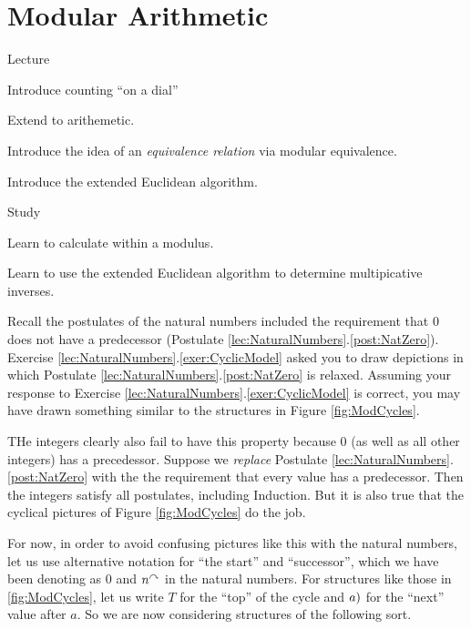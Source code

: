 \chapter{Modular Arithmetic}

\begin{goals}
	\begin{goal}{Lecture}
		\item Introduce counting ``on a dial''
		\item Extend to arithemetic.
		\item Introduce the idea of an \emph{equivalence relation} via modular equivalence.
		\item Introduce the extended Euclidean algorithm.
	\end{goal}
	
	\begin{goal}{Study}
		\item Learn to calculate within a modulus.
		\item Learn to use the extended Euclidean algorithm to determine multipicative inverses.
	\end{goal}
\end{goals}

Recall the postulates of the natural numbers included the requirement that $0$ does not have  a predecessor (Postulate \ref{lec:NaturalNumbers}.\ref{post:NatZero}).  Exercise \ref{lec:NaturalNumbers}.\ref{exer:CyclicModel} asked you to draw depictions in which Postulate \ref{lec:NaturalNumbers}.\ref{post:NatZero} is relaxed. 
Assuming your response to Exercise \ref{lec:NaturalNumbers}.\ref{exer:CyclicModel} is correct, you may have drawn something similar to the structures in Figure \ref{fig:ModCycles}.

THe integers clearly also fail to have this property because $0$ (as well as all other integers) has a precedessor. Suppose we \emph{replace} Postulate \ref{lec:NaturalNumbers}.\ref{post:NatZero} with the the requirement that every value has a predecessor. Then the integers satisfy all postulates, including Induction. But it is also true that the cyclical pictures of Figure \ref{fig:ModCycles} do the job. 

For now, in order to avoid confusing pictures like this with the natural numbers, let us use alternative notation for ``the start'' and ``successor'', which we have been denoting as $0$ and $n^\curvearrowright$ in the natural numbers.
For structures like those in \ref{fig:ModCycles}, let us write $T$ for the ``top'' of the cycle and $\next(a)$ for the ``next'' value after $a$. So we are now considering structures of the following sort.


